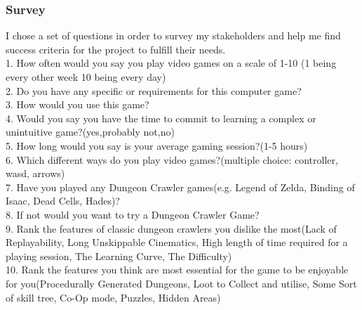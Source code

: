 \documentclass{article}
\begin{document}
        \subsubsection{Survey}
        I chose a set of questions in order to survey my stakeholders and help me find success criteria for the project to fulfill their needs.\\
        1. How often would you say you play video games on a scale of 1-10 (1 being every other week 10 being every day)\\
        2. Do you have any specific or requirements for this computer game?\\
        3. How would you use this game?\\
        4. Would you say you have the time to commit to learning a complex or unintuitive game?(yes,probably not,no)\\
        5. How long would you say is your average gaming session?(1-5 hours)\\
        6. Which different ways do you play video games?(multiple choice: controller, wasd, arrows)\\
        7. Have you played any Dungeon Crawler games(e.g. Legend of Zelda, Binding of Isaac, Dead Cells, Hades)?\\
        8. If not would you want to try a Dungeon Crawler Game?\\
        9. Rank the features of classic dungeon crawlers you dislike the most(Lack of Replayability, Long Unskippable Cinematics, High length of time required for a playing session, The Learning Curve, The Difficulty)\\
        10. Rank the features you think are most essential for the game to be enjoyable for you(Procedurally Generated Dungeons, Loot to Collect and utilise, Some Sort of skill tree, Co-Op mode, Puzzles, Hidden Areas)\\
        \newpage
\end{document}
